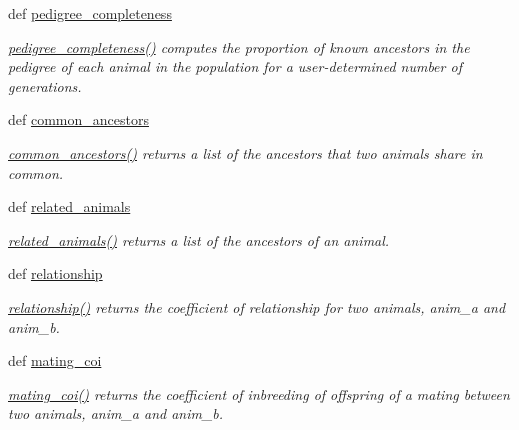 \begin{CompactItemize}
def \hyperlink{namespacePyPedal_1_1pyp__metrics_9839b790d3161aaf080c649adcdaff26}{pedigree\_\-completeness}
\begin{CompactList}\small\item\em \hyperlink{namespacePyPedal_1_1pyp__metrics_9839b790d3161aaf080c649adcdaff26}{pedigree\_\-completeness()} computes the proportion of known ancestors in the pedigree of each animal in the population for a user-determined number of generations. \item\end{CompactList}\item 
def \hyperlink{namespacePyPedal_1_1pyp__metrics_43a82ce2cfd34b53ddf6d29c4671d480}{common\_\-ancestors}
\begin{CompactList}\small\item\em \hyperlink{namespacePyPedal_1_1pyp__metrics_43a82ce2cfd34b53ddf6d29c4671d480}{common\_\-ancestors()} returns a list of the ancestors that two animals share in common. \item\end{CompactList}\item 
def \hyperlink{namespacePyPedal_1_1pyp__metrics_ec3083eaf96d141f21de2ee947cdeee8}{related\_\-animals}
\begin{CompactList}\small\item\em \hyperlink{namespacePyPedal_1_1pyp__metrics_ec3083eaf96d141f21de2ee947cdeee8}{related\_\-animals()} returns a list of the ancestors of an animal. \item\end{CompactList}\item 
def \hyperlink{namespacePyPedal_1_1pyp__metrics_84284c26af4c946ca9f49657b6d92fcf}{relationship}
\begin{CompactList}\small\item\em \hyperlink{namespacePyPedal_1_1pyp__metrics_84284c26af4c946ca9f49657b6d92fcf}{relationship()} returns the coefficient of relationship for two animals, anim\_\-a and anim\_\-b. \item\end{CompactList}\item 
def \hyperlink{namespacePyPedal_1_1pyp__metrics_41c2baf2ca7fae116732adc32ff3a51b}{mating\_\-coi}
\begin{CompactList}\small\item\em \hyperlink{namespacePyPedal_1_1pyp__metrics_41c2baf2ca7fae116732adc32ff3a51b}{mating\_\-coi()} returns the coefficient of inbreeding of offspring of a mating between two animals, anim\_\-a and anim\_\-b. \item\end{CompactList}\item 

\end{CompactItemize}
